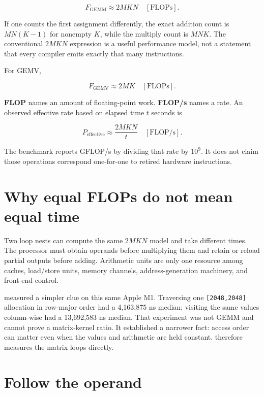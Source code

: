 \begin{equation}
F_{\mathrm{GEMM}}\approx2MKN\quad[\mathrm{FLOPs}].
\end{equation}

If one counts the first assignment differently, the exact addition count
is \(MN(K-1)\) for nonempty \(K\), while the multiply count is \(MNK\).
The conventional \(2MKN\) expression is a useful performance model, not
a statement that every compiler emits exactly that many instructions.

For GEMV,

\begin{equation}
F_{\mathrm{GEMV}}\approx2MK\quad[\mathrm{FLOPs}].
\end{equation}

\textbf{FLOP} names an amount of floating-point work. \textbf{FLOP/s}
names a rate. An observed effective rate based on elapsed time \(t\)
seconds is

\begin{equation}
P_{\mathrm{effective}}
\approx\frac{2MKN}{t}\quad[\mathrm{FLOP/s}].
\end{equation}

The benchmark reports GFLOP/s by dividing that rate by \(10^9\). It does
not claim those operations correspond one-for-one to retired hardware
instructions.

\section{Why equal FLOPs do not mean equal
time}\label{why-equal-flops-do-not-mean-equal-time}

Two loop nests can compute the same \(2MKN\) model and take different
times. The processor must obtain operands before multiplying them and
retain or reload partial outputs before adding. Arithmetic units are
only one resource among caches, load/store units, memory channels,
address-generation machinery, and front-end control.

 measured a simpler clue on this same Apple M1. Traversing one
\texttt{{[}2048,2048{]}} allocation in row-major order had a 4,163,875
ns median; visiting the same values column-wise had a 13,692,583 ns
median. That experiment was not GEMM and cannot prove a matrix-kernel
ratio. It established a narrower fact: access order can matter even when
the values and arithmetic are held constant.  therefore
measures the matrix loops directly.

\section{Follow the operand}\label{follow-the-operand}

